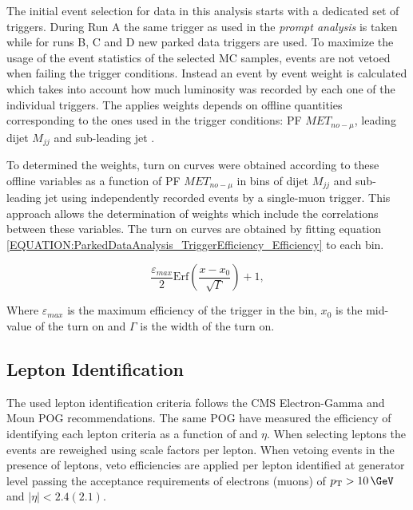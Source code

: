 
The initial event selection for data in this analysis starts with a dedicated set of triggers. During Run A the same trigger as used in the \textit{prompt analysis} is taken while for runs B, C and D new parked data triggers are used. To maximize the usage of the event statistics of the selected \gls{MC} samples, events are not vetoed  when failing the trigger conditions. Instead an event by event weight is calculated which takes into account how much luminosity was recorded by each one of the individual triggers. The applies weights depends on offline quantities corresponding to the ones used in the trigger conditions: \gls{PF} $MET_{no-\mu}$, leading dijet $M_{jj}$ and sub-leading jet \pt. 

To determined the weights, turn on curves were obtained according to these offline variables as a function of \gls{PF} $MET_{no-\mu}$ in bins of dijet $M_{jj}$ and sub-leading jet \pt using independently recorded events by a single-muon trigger. This approach allows the determination of weights which include the correlations between these variables. The turn on curves are obtained by fitting equation \ref{EQUATION:ParkedDataAnalysis_TriggerEfficiency_Efficiency} to each bin.

\begin{equation}
\frac{\varepsilon_{max}}{2}\text{Erf}\left(\frac{x-x_{0}}{\sqrt{\Gamma}}\right)+1,
\label{EQUATION:ParkedDataAnalysis_TriggerEfficiency_Efficiency} 
\end{equation}

Where $\varepsilon_{max}$ is the maximum efficiency of the trigger in the bin, $x_{0}$ is the mid-value of the turn on and $\Gamma$ is the width of the turn on.

\subsection{Lepton Identification}


The used lepton identification criteria follows the \gls{CMS} Electron-Gamma and Moun \gls{POG} recommendations. The same \gls{POG} have measured the efficiency of identifying each lepton criteria as a function of \pt and $\eta$. When selecting leptons the events are reweighed using scale factors per lepton. When vetoing events in the presence of leptons, veto efficiencies are applied per lepton identified at generator level passing the acceptance requirements of electrons (muons) of $\pt>10\,\GeV$ and $|\eta|<2.4(2.1)$.

